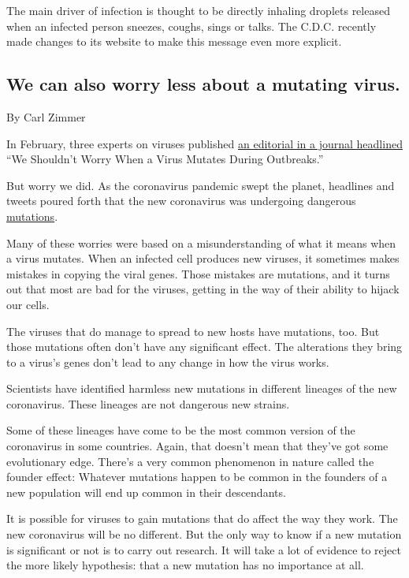 The main driver of infection is thought to be directly inhaling droplets
released when an infected person sneezes, coughs, sings or talks. The
C.D.C. recently made changes to its website to make this message even
more explicit.

\hypertarget{we-can-also-worry-less-about-a-mutating-virus}{%
\subsection{We can also worry less about a mutating
virus.}\label{we-can-also-worry-less-about-a-mutating-virus}}

By Carl Zimmer

In February, three experts on viruses published
\href{https://www.nature.com/articles/s41564-020-0690-4}{an editorial in
a journal headlined} ``We Shouldn't Worry When a Virus Mutates During
Outbreaks.''

But worry we did. As the coronavirus pandemic swept the planet,
headlines and tweets poured forth that the new coronavirus was
undergoing dangerous
\href{https://www.nytimes3xbfgragh.onion/2020/07/02/health/coronavirus-korber-mutation.html}{mutations}.

Many of these worries were based on a misunderstanding of what it means
when a virus mutates. When an infected cell produces new viruses, it
sometimes makes mistakes in copying the viral genes. Those mistakes are
mutations, and it turns out that most are bad for the viruses, getting
in the way of their ability to hijack our cells.

The viruses that do manage to spread to new hosts have mutations, too.
But those mutations often don't have any significant effect. The
alterations they bring to a virus's genes don't lead to any change in
how the virus works.

Scientists have identified harmless new mutations in different lineages
of the new coronavirus. These lineages are not dangerous new strains.

Some of these lineages have come to be the most common version of the
coronavirus in some countries. Again, that doesn't mean that they've got
some evolutionary edge. There's a very common phenomenon in nature
called the founder effect: Whatever mutations happen to be common in the
founders of a new population will end up common in their descendants.

It is possible for viruses to gain mutations that do affect the way they
work. The new coronavirus will be no different. But the only way to know
if a new mutation is significant or not is to carry out research. It
will take a lot of evidence to reject the more likely hypothesis: that a
new mutation has no importance at all.

